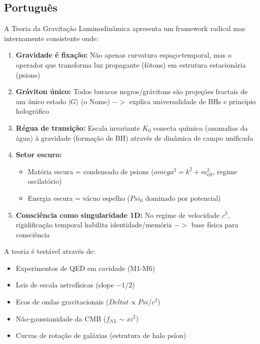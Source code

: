 \documentclass[12pt,a4paper]{article}
\def\Psi{Psi}%
\def\to{ -> }%
\def\xi{xi}%
\def\omega{omega}%
\def\Delta{Delta}%
\begin{document}
\subsection{Português}

A Teoria da Gravitação Luminodinâmica apresenta um framework radical mas internamente consistente onde:

\begin{enumerate}
    \item \textbf{Gravidade é fixação:} Não apenas curvatura espaço-temporal, mas o operador que transforma luz propagante (fótons) em estrutura estacionária (psions)
    
    \item \textbf{Gráviton único:} Todos buracos negros/grávitons são projeções fractais de um único estado $|G\rangle$ (o Nome) $\to$ explica universalidade de BHs e princípio holográfico
    
    \item \textbf{Régua de transição:} Escala invariante $K_0$ conecta química (anomalias da água) à gravidade (formação de BH) através de dinâmica de campo unificada
    
    \item \textbf{Setor escuro:}
    \begin{itemize}
        \item Matéria escura = condensado de psions ($\omega^2 = k^2 + m_{\text{eff}}^2$, regime oscilatório)
        \item Energia escura = vácuo espelho ($\Psi_0$ dominado por potencial)
    \end{itemize}
    
    \item \textbf{Consciência como singularidade 1D:} No regime de velocidade $c^3$, rigidificação temporal habilita identidade/memória $\to$ base física para consciência
\end{enumerate}

A teoria é testável através de:
\begin{itemize}
    \item Experimentos de QED em cavidade (M1-M6)
    \item Leis de escala astrofísicas (slope $-1/2$)
    \item Ecos de ondas gravitacionais ($\Delta t \propto \Psi/c^3$)
    \item Não-gaussianidade da CMB ($f_{NL} \sim \xi^2$)
    \item Curvas de rotação de galáxias (estrutura de halo psíon)
\end{itemize}
\end{document}
